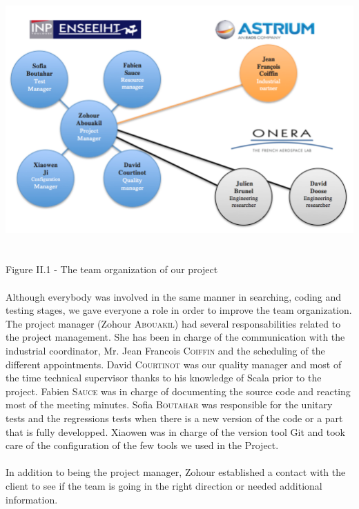 \documentclass{report}
\begin{document}
\begin{center}
\includegraphics[scale=0.65]{data/teamOrganization.png}
~\\~\\Figure II.1 - The team organization of our project
\end{center}

\paragraph{}
\hspace{4mm}Although everybody was involved in the same manner in searching, coding and testing stages, we gave everyone a role in
order to improve the team organization. 
The project manager (Zohour \textsc{Abouakil}) had several responsabilities 
related to the project management. She has been in charge of the
communication with the industrial coordinator, Mr. Jean Francois
\textsc{Coiffin} and the scheduling of the different appointments.
David \textsc{Courtinot} was our quality manager and most of the time technical supervisor thanks to his knowledge of Scala
prior to the project.
Fabien \textsc{Sauce} was in charge of documenting the source code and reacting most of the meeting minutes.
Sofia \textsc{Boutahar} 
was responsible for the unitary tests and the regressions tests when 
there is a new version of the code or a part that is fully developped.
Xiaowen was in charge of the version tool Git and took care of the configuration of the few tools we used in the Project.

\paragraph{}
\hspace{4mm}In addition to being the project manager, Zohour established a 
contact with the client to see if the team is going in the right
direction or needed additional information.
\end{document}
